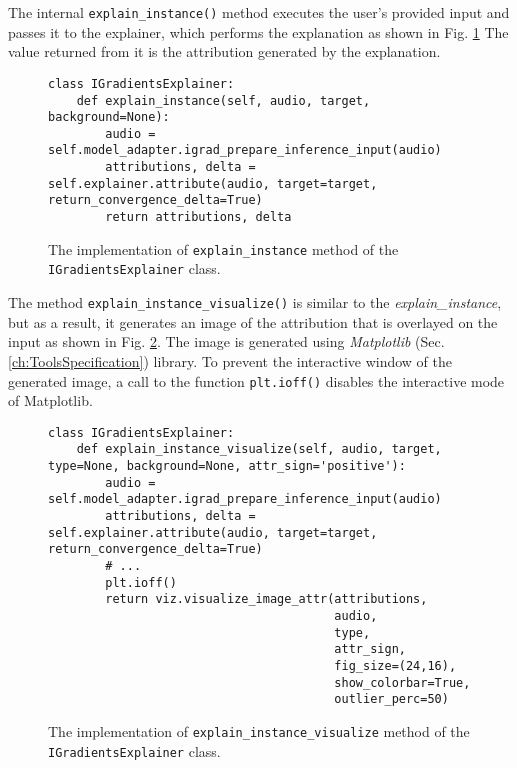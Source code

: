 \documentclass[
    bindingoffset=5mm,  %
    footnoteindent=3mm, %
    hyphenation=true    %
]{src/wut-thesis}
\begin{document}
The internal \texttt{explain_instance()} method executes the user’s provided input and passes
it to the explainer, which performs the explanation as shown in Fig. \ref{fig:ExplainInstance}
The value returned from it is the attribution generated by the explanation.

\begin{figure}[h!]
\begin{verbatim}
class IGradientsExplainer:
    def explain_instance(self, audio, target, background=None):
        audio = self.model_adapter.igrad_prepare_inference_input(audio)
        attributions, delta = self.explainer.attribute(audio, target=target, return_convergence_delta=True)
        return attributions, delta
\end{verbatim}
\caption{The implementation of \texttt{explain\_instance} method of the \texttt{IGradientsExplainer} class.}
\label{fig:ExplainInstance}
\end{figure}

The method \texttt{explain_instance_visualize()} is similar to the \emph{explain\_instance}, 
but as a result, it generates an image of the attribution that is overlayed on the
input as shown in Fig. \ref{fig:ExplainInstanceVisualize}.
The image is generated using \emph{Matplotlib} (Sec. \ref{ch:ToolsSpecification}) library.
To prevent the interactive window of the generated image, a call to the function \texttt{plt.ioff()}
disables the interactive mode of Matplotlib.

\begin{figure}[h!]
\begin{verbatim}
class IGradientsExplainer:
    def explain_instance_visualize(self, audio, target, type=None, background=None, attr_sign='positive'):
        audio = self.model_adapter.igrad_prepare_inference_input(audio)
        attributions, delta = self.explainer.attribute(audio, target=target, return_convergence_delta=True)
        # ...
        plt.ioff()
        return viz.visualize_image_attr(attributions,
                                        audio,
                                        type,
                                        attr_sign,
                                        fig_size=(24,16),
                                        show_colorbar=True,
                                        outlier_perc=50)
\end{verbatim}
\caption{The implementation of \texttt{explain\_instance\_visualize} method of the \texttt{IGradientsExplainer} class.}
\label{fig:ExplainInstanceVisualize}
\end{figure}
\end{document}
